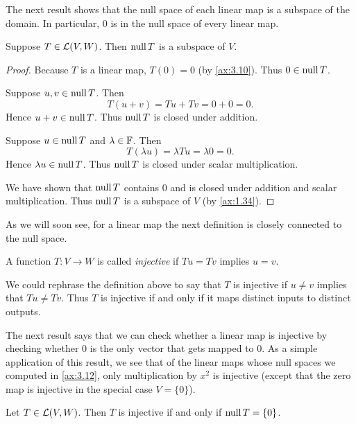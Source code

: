 The next result shows that the null space of each linear map is a subspace of
the domain. In particular, $0$ is in the null space of every linear map.

\begin{result}\label{ax:3.13}
Suppose $T\in\mathcal{L}(V,W)$. Then $\operatorname{null} T$ is a subspace of $V$.
\end{result}

\begin{proof}
Because $T$ is a linear map, $T(0)=0$ (by \ref{ax:3.10}). Thus
$0\in\operatorname{null} T$.

Suppose $u,v\in\operatorname{null} T$. Then
\[ T(u+v)=Tu+Tv=0+0=0. \]
Hence $u+v\in\operatorname{null} T$. Thus $\operatorname{null} T$ is closed under addition.

Suppose $u\in\operatorname{null} T$ and $\lambda\in\mathbb{F}$. Then
\[ T(\lambda u)=\lambda Tu=\lambda0=0. \]
Hence $\lambda u\in\operatorname{null} T$. Thus $\operatorname{null} T$ is closed under scalar
multiplication.

We have shown that $\operatorname{null} T$ contains $0$ and is closed under addition and
scalar multiplication. Thus $\operatorname{null} T$ is a subspace of $V$ (by
\ref{ax:1.34}).
\end{proof}

As we will soon see, for a linear map the next definition is closely
connected to the null space.

\begin{definition}[Injective]\label{ax:3.14}
A function $T\colon V\to W$ is called \emph{injective} if $Tu=Tv$ implies
$u=v$.
\end{definition}

%
We could rephrase the definition above to say that $T$ is injective if
$u\ne v$ implies that $Tu\ne Tv$. Thus $T$ is injective if and only if it maps
distinct inputs to distinct outputs.

The next result says that we can check whether a linear map is injective by
checking whether $0$ is the only vector that gets mapped to $0$. As a simple
application of this result, we see that of the linear maps whose null spaces
we computed in \ref{ax:3.12}, only multiplication by $x^2$ is injective
(except that the zero map is injective in the special case $V=\{0\}$).

\begin{result}\label{ax:3.15}
Let $T\in\mathcal{L}(V,W)$. Then $T$ is injective if and only if $\operatorname{null} T=\{0\}$.
\end{result}

